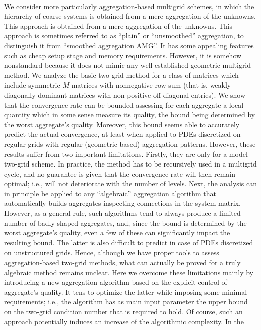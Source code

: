 \\
We consider more particularly aggregation-based multigrid schemes, in which
the hierarchy of coarse systems is obtained from a mere aggregation of the
unknowns. This approach is obtained from a mere aggregation of the unknowns.
This approach is sometimes referred to as ``plain'' or ``unsmoothed''
aggregation, to distinguish it from ``smoothed aggregation AMG''. It has some
appealing features such as cheap setup stage and memory requirements. However,
it is somehow nonstandard because it does not mimic any well-established
geometric multigrid method. We analyze the basic two-grid method for a class
of matrices which include symmetric $M$-matrices with nonnegative row sum
(that is, weakly diagonally dominant matrices with non positive off diagonal
entries). We show that the convergence rate can be bounded assessing for each
aggregate a local quantity which in some sense measure its quality, the bound
being determined by the worst aggregate's quality. Moreover, this bound seems
able to accurately predict the actual convergence, at least when applied to
PDEs discretized on regular grids with regular (geometric based) aggregation
patterns. However, these results suffer from two important limitations.
Firstly, they are only for a model two-grid scheme. In practice, the method
has to be recursively used in a multigrid cycle, and no guarantee is given
that the convergence rate will then remain optimal; i.e., will not deteriorate
with the number of levels. Next, the analysis can in principle be applied to
any ``algebraic'' aggregation algorithm that automatically builds aggregates
inspecting connections in the system matrix. However, as a general rule, such
algorithms tend to always produce a limited number of badly shaped aggregates,
and, since the bound is determined by the worst aggregate's quality, even a
few of these can significantly impact the resulting bound. The latter is also
difficult to predict in case of PDEs discretized on unstructured grids. Hence,
although we have proper tools to assess aggregation-based two-grid methods,
what can actually be proved for a truly algebraic method remains unclear. Here
we overcome these limitations mainly by introducing a new aggregation
algorithm based on the explicit control of aggregate's quality. It tens to
optimize the latter while imposing some minimal requirements; i.e., the
algorithm has as main input parameter the upper bound on the two-grid
condition number that is required to hold. Of course, such an approach
potentially induces an increase of the algorithmic complexity. In the
